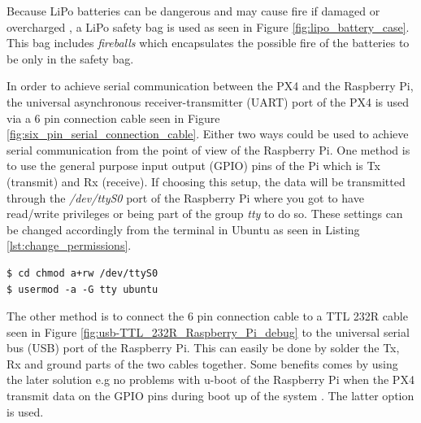 \documentclass[../Head/report.tex]{subfiles}
\begin{document}
Because LiPo batteries can be dangerous and may cause fire if damaged or overcharged \cite{lipoBatteryGuide}, a LiPo safety bag is used as seen in Figure \ref{fig:lipo_battery_case}. This bag includes \textit{fireballs} which encapsulates the possible fire of the batteries to be only in the safety bag. 

In order to achieve serial communication between the PX4 and the Raspberry Pi, the universal asynchronous receiver-transmitter (UART) port of the PX4 is used via a 6 pin connection cable seen in Figure \ref{fig:six_pin_serial_connection_cable}. Either two ways could be used to achieve serial communication from the point of view of the Raspberry Pi. One method is to use the general purpose input output (GPIO) pins of the Pi which is Tx (transmit) and Rx (receive). If choosing this setup, the data will be transmitted through the \textit{/dev/ttyS0} port of the Raspberry Pi where you got to have read/write privileges or being part of the group \textit{tty} to do so. These settings can be changed accordingly from the terminal in Ubuntu as seen in Listing \ref{lst:change_permissions}. 

\begin{lstlisting}[frame=none,caption={How to change read/write permissions along with adding a user (ubuntu) to the tty group}, label=lst:change_permissions]
$ cd chmod a+rw /dev/ttyS0
$ usermod -a -G tty ubuntu
\end{lstlisting}

The other method is to connect the 6 pin connection cable to a TTL 232R cable seen in Figure \ref{fig:usb-TTL_232R_Raspberry_Pi_debug} to the universal serial bus (USB) port of the Raspberry Pi. This can easily be done by solder the Tx, Rx and ground parts of the two cables together. Some benefits comes by using the later solution e.g no problems with u-boot of the Raspberry Pi when the PX4 transmit data on the GPIO pins during boot up of the system  \cite{uBoot}. The latter option is used.
\end{document}
